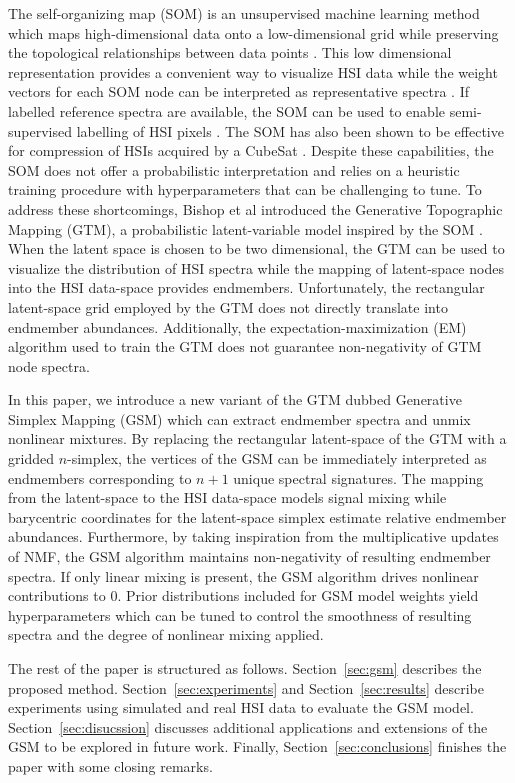 \documentclass[remotesensing,article,submit,pdftex,moreauthors]{Definitions/mdpi}
\begin{document}
The self-organizing map (SOM) is an unsupervised machine learning method which maps high-dimensional data onto a low-dimensional grid while preserving the topological relationships between data points \cite{kohonen-som-1}. This low dimensional representation provides a convenient way to visualize HSI data while the weight vectors for each SOM node can be interpreted as representative spectra \cite{cantero2004analysis, duran2007time,som-hsi}. If labelled reference spectra are available, the SOM can be used to enable semi-supervised labelling of HSI pixels \cite{riese2019supervised}. The SOM has also been shown to be effective for compression of HSIs acquired by a CubeSat \cite{som-satellite}. Despite these capabilities, the SOM does not offer a probabilistic interpretation and relies on a heuristic training procedure with hyperparameters that can be challenging to tune. To address these shortcomings, Bishop et al introduced the Generative Topographic Mapping (GTM), a probabilistic latent-variable model inspired by the SOM \cite{gtm-orig}. When the latent space is chosen to be two dimensional, the GTM can be used to visualize the distribution of HSI spectra while the mapping of latent-space nodes into the HSI data-space provides endmembers\cite{robot-team-gtm}. Unfortunately, the rectangular latent-space grid employed by the GTM does not directly translate into endmember abundances. Additionally, the expectation-maximization (EM) algorithm used to train the GTM does not guarantee non-negativity of GTM node spectra. 

In this paper, we introduce a new variant of the GTM dubbed Generative Simplex Mapping (GSM) which can extract endmember spectra and unmix nonlinear mixtures. By replacing the rectangular latent-space of the GTM with a gridded $n$-simplex, the vertices of the GSM can be immediately interpreted as endmembers corresponding to $n+1$ unique spectral signatures. The mapping from the latent-space to the HSI data-space models signal mixing while barycentric coordinates for the latent-space simplex estimate relative endmember abundances. Furthermore, by taking inspiration from the multiplicative updates of NMF, the GSM algorithm maintains non-negativity of resulting endmember spectra. If only linear mixing is present, the GSM algorithm drives nonlinear contributions to $0$. Prior distributions included for GSM model weights yield hyperparameters which can be tuned to control the smoothness of resulting spectra and the degree of nonlinear mixing applied.

The rest of the paper is structured as follows. Section~\ref{sec:gsm} describes the proposed method. Section~\ref{sec:experiments} and Section~\ref{sec:results} describe experiments using simulated and real HSI data to evaluate the GSM model. Section~\ref{sec:disucssion} discusses additional applications and extensions of the GSM to be explored in future work. Finally, Section~\ref{sec:conclusions} finishes the paper with some closing remarks.
\end{document}
